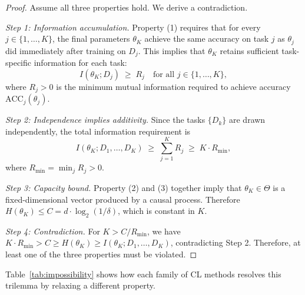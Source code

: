 \documentclass{article}
\begin{document}
\begin{proof}
Assume all three properties hold. We derive a contradiction.

\emph{Step 1: Information accumulation.} Property (1) requires that for every $j \in \{1, \ldots, K\}$, the final parameters $\theta_K$ achieve the same accuracy on task $j$ as $\theta_j$ did immediately after training on $D_j$. This implies that $\theta_K$ retains sufficient task-specific information for each task:
\begin{equation}
    I(\theta_K; D_j) \;\geq\; R_j \quad \text{for all } j \in \{1, \ldots, K\},
\end{equation}
where $R_j > 0$ is the minimum mutual information required to achieve accuracy $\mathrm{ACC}_j(\theta_j)$.

\emph{Step 2: Independence implies additivity.} Since the tasks $\{D_k\}$ are drawn independently, the total information requirement is
\begin{equation}
    I(\theta_K; D_1, \ldots, D_K) \;\geq\; \sum_{j=1}^K R_j \;\geq\; K \cdot R_\mathrm{min},
\end{equation}
where $R_\mathrm{min} = \min_j R_j > 0$.

\emph{Step 3: Capacity bound.} Property (2) and (3) together imply that $\theta_K \in \Theta$ is a fixed-dimensional vector produced by a causal process. Therefore $H(\theta_K) \leq C = d \cdot \log_2(1/\delta)$, which is constant in $K$.

\emph{Step 4: Contradiction.} For $K > C / R_\mathrm{min}$, we have $K \cdot R_\mathrm{min} > C \geq H(\theta_K) \geq I(\theta_K; D_1, \ldots, D_K)$, contradicting Step 2. Therefore, at least one of the three properties must be violated. \qedhere
\end{proof}

Table~\ref{tab:impossibility} shows how each family of CL methods resolves this trilemma by relaxing a different property.
\end{document}
